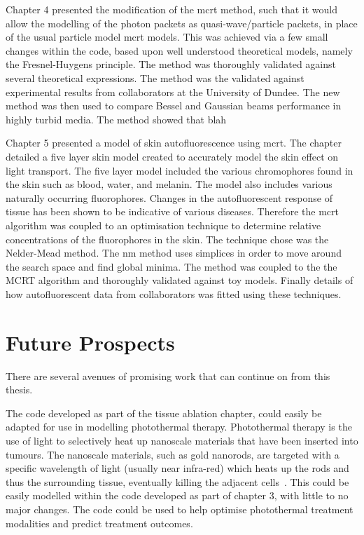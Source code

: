 \medskip

Chapter 4 presented the modification of the \gls*{mcrt} method, such that it would allow the modelling of the photon packets as quasi-wave/particle packets, in place of the usual particle model \gls*{mcrt} models.
This was achieved via a few small changes within the code, based upon well understood theoretical models, namely the Fresnel-Huygens principle.
The method was thoroughly validated against several theoretical expressions.
The method was the validated against experimental results from collaborators at the University of Dundee.
The new method was then used to compare Bessel and Gaussian beams performance in highly turbid media.
The method showed that blah

\medskip

Chapter 5 presented a model of skin autofluorescence using \gls*{mcrt}.
The chapter detailed a five layer skin model created to accurately model the skin effect on light transport.
The five layer model included the various chromophores found in the skin such as blood, water, and melanin.
The model also includes various naturally occurring fluorophores.
Changes in the autofluorescent response of tissue has been shown to be indicative of various diseases.
Therefore the \gls*{mcrt} algorithm was coupled to an optimisation technique to determine relative concentrations of the fluorophores in the skin.
The technique chose was the Nelder-Mead method.
The \gls*{nm} method uses simplices in order to move around the search space and find global minima.
The method was coupled to the the MCRT algorithm and thoroughly validated against toy models.
Finally details of how autofluorescent data from collaborators was fitted using these techniques.

\section{Future Prospects}

There are several avenues of promising work that can continue on from this thesis.

The code developed as part of the tissue ablation chapter, could easily be adapted for use in modelling photothermal therapy.
Photothermal therapy is the use of light to selectively heat up nanoscale materials that have been inserted into tumours.
The nanoscale materials, such as gold nanorods, are targeted with a specific wavelength of light (usually near infra-red) which heats up the rods and thus the surrounding tissue, eventually killing the adjacent cells~\cite{singh2016application,gallina2016aptamer}.
This could be easily modelled within the code developed as part of chapter 3, with little to no major changes.
The code could be used to help optimise photothermal treatment modalities and predict treatment outcomes.

